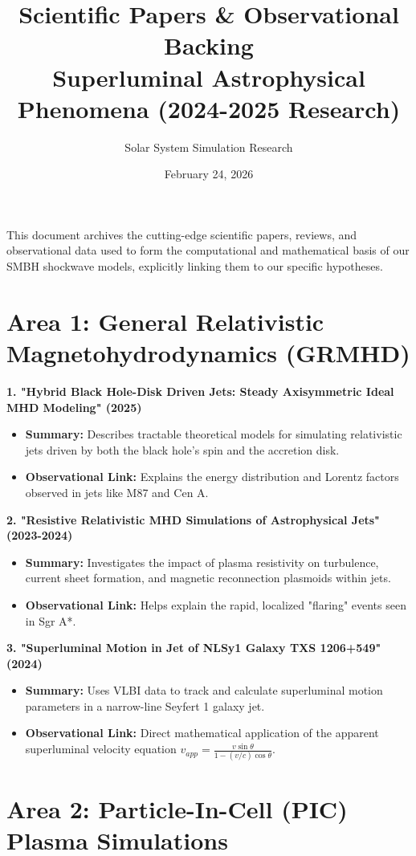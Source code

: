 \documentclass{article}
\title{Scientific Papers \& Observational Backing \\ \large Superluminal Astrophysical Phenomena (2024-2025 Research)}
\author{Solar System Simulation Research}
\date{February 24, 2026}
\begin{document}
\maketitle

This document archives the cutting-edge scientific papers, reviews, and observational data used to form the computational and mathematical basis of our SMBH shockwave models, explicitly linking them to our specific hypotheses.

\section*{Area 1: General Relativistic Magnetohydrodynamics (GRMHD)}

\textbf{1. "Hybrid Black Hole-Disk Driven Jets: Steady Axisymmetric Ideal MHD Modeling" (2025)}
\begin{itemize}
    \item \textbf{Summary:} Describes tractable theoretical models for simulating relativistic jets driven by both the black hole's spin and the accretion disk.
    \item \textbf{Observational Link:} Explains the energy distribution and Lorentz factors observed in jets like M87 and Cen A.
\end{itemize}

\textbf{2. "Resistive Relativistic MHD Simulations of Astrophysical Jets" (2023-2024)}
\begin{itemize}
    \item \textbf{Summary:} Investigates the impact of plasma resistivity on turbulence, current sheet formation, and magnetic reconnection plasmoids within jets.
    \item \textbf{Observational Link:} Helps explain the rapid, localized "flaring" events seen in Sgr A*.
\end{itemize}

\textbf{3. "Superluminal Motion in Jet of NLSy1 Galaxy TXS 1206+549" (2024)}
\begin{itemize}
    \item \textbf{Summary:} Uses VLBI data to track and calculate superluminal motion parameters in a narrow-line Seyfert 1 galaxy jet.
    \item \textbf{Observational Link:} Direct mathematical application of the apparent superluminal velocity equation $v_{app} = \frac{v \sin\theta}{1 - (v/c)\cos\theta}$.
\end{itemize}

\section*{Area 2: Particle-In-Cell (PIC) Plasma Simulations}
\end{document}
